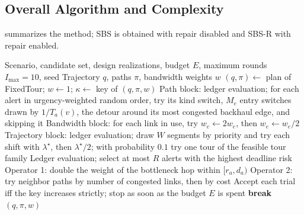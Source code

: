 \subsection{Overall Algorithm and Complexity}
\label{sec:overall}

 summarizes the method; SBS is obtained with repair disabled and SBS-R with repair enabled.

\begin{algorithm}[htbp]
\caption{Sample-scored block search with schedule repair.}
\label{alg:bcd-repair}
\begin{algorithmic}[1]
\Require Scenario, candidate set, design realizations, budget $E$, maximum rounds $I_{\max}=10$, seed
\Ensure Trajectory $q$, paths $\pi$, bandwidth weights $w$
\State $(q,\pi)\gets$ plan of FixedTour; $w\gets 1$; $\kappa\gets$ key of $(q,\pi,w)$
    \State Path block: ledger evaluation; for each alert in urgency-weighted random order, try its kind switch, $M_e$ entry switches drawn by $1/T_a(v)$, the detour around its most congested backhaul edge, and skipping it
    \State Bandwidth block: for each link in use, try $w_e\gets 2w_e$, then $w_e\gets w_e/2$
    \State Trajectory block: ledger evaluation; draw $W$ segments by priority and try each shift with $\lambda^\star$, then $\lambda^\star/2$; with probability $0.1$ try one tour of the feasible tour family
        \State Ledger evaluation; select at most $R$ alerts with the highest deadline risk
            \State Operator 1: double the weight of the bottleneck hop within $[r_a,d_a)$
            \State Operator 2: try neighbor paths by number of congested links, then by cost
        \EndFor
    \EndIf
    \State Accept each trial iff the key increases strictly; stop as soon as the budget $E$ is spent
     \textbf{break} \EndIf
\EndFor
\State \Return $(q,\pi,w)$
\end{algorithmic}
\end{algorithm}

